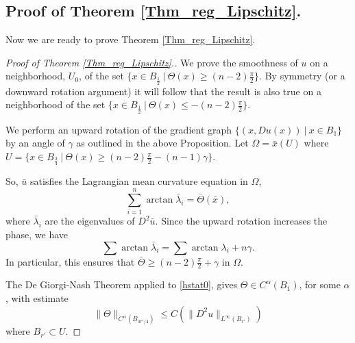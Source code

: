 \documentclass[12pt,reqno]{amsart}%
\theoremstyle{plain}
\numberwithin{equation}{section}
\theoremstyle{definition}
\theoremstyle{remark}
\begin{document}
\subsection{Proof of Theorem \ref{Thm_reg_Lipschitz}.}
Now we are ready to prove Theorem \ref{Thm_reg_Lipschitz}.
\begin{proof}[Proof of Theorem \ref{Thm_reg_Lipschitz}.]
    We prove the smoothness of $u$ on a neighborhood, $U_0$, of the set $\{ x \in B_{\frac 12 } \: \vert \: \Theta ( x) \geq (n-2 ) \frac \pi 2 \} .$ By symmetry (or a downward rotation argument) it will follow that the result is also true on a neighborhood of the set $\{x \in B_{\frac12} \: \vert \: \Theta ( x) \leq - ( n-2 ) \frac \pi 2 \}.$
    
    We perform an upward rotation of the gradient graph $\{(x, Du(x))\: \vert\:  x \in B_1\}$ by an angle of $\gamma$ as outlined in the above Proposition. Let $\Omega=\bar x (U)$ where $U = \{ x \in B_{\frac 34} \: \vert \: \Theta ( x) \geq (n-2) \frac \pi 2 - (n-1)\gamma\}.$
    
    So, $\bar u$ satisfies the Lagrangian mean curvature equation in $\Omega$,
    \begin{equation}
        \sum_{i=1}^n \arctan \bar \lambda_i=\bar \Theta(\bar x), \label{rs}
    \end{equation} 
    where $\bar\lambda_i$ are the eigenvalues of $D^2 \bar u$. Since the upward rotation increases the phase, we have
     \[
    \sum \arctan \bar \lambda_i  = \sum \arctan \lambda_ i + n \gamma . \]
In particular, this ensures that $\bar \Theta \geq ( n-2) \frac \pi 2 + \gamma $ in $\Omega$.
    
    
    The De Giorgi-Nash Theorem applied to \eqref{hstat0}, gives $\Theta\in C^{\alpha}(B_1)$, for some $\alpha$, with estimate
    \begin{equation}
        \|\Theta\|_{C^{\alpha}(B_{3r'/4})}\leq C(\| D^2 u\|_{L^{\infty}(B_{r'})})\label{DGN} 
    \end{equation} where $B_{r'}\subset U.$





\end{proof}
\end{document}
